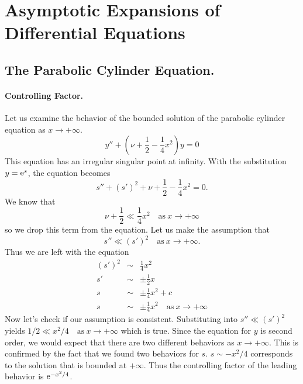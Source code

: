 \section{Asymptotic Expansions of Differential Equations}










\subsection{The Parabolic Cylinder Equation.}

\paragraph{Controlling Factor.}
Let us examine the behavior of the bounded solution of the parabolic 
cylinder equation as $x \to + \infty$.  
\[ y'' + \left(\nu + \frac{1}{2} - \frac{1}{4} x^2\right)y = 0\]
This equation has an irregular singular point at infinity.  
With the substitution $y = \mathop{\mathrm{e}}\nolimits^s$,
the equation becomes
\[s'' + (s')^2 + \nu + \frac{1}{2} - \frac{1}{4} x^2 = 0.\]
We know that 
\[ \nu + \frac{1}{2} \ll \frac{1}{4} x^2\quad \mathrm{as}\ x \to +\infty\]
so we drop this term from the equation. Let us make the assumption that
\[ s'' \ll (s')^2\quad \mathrm{as}\ x \to +\infty.\]
Thus we are left with the equation
\begin{eqnarray*}
  (s')^2 &\sim& \frac{1}{4} x^2 \\
  s' &\sim& \pm \frac{1}{2} x \\
  s &\sim& \pm \frac{1}{4} x^2 + c \\
  s &\sim& \pm \frac{1}{4} x^2\quad \mathrm{as}\ x \to +\infty
\end{eqnarray*}
Now let's check if our assumption is consistent.  Substituting into
$s'' \ll (s')^2$ yields $1/2 \ll x^2/4\quad \mathrm{as}\ x  \to +\infty$ which 
is true.  Since the equation for $y$ is second order, we would expect that 
there are two different behaviors as $x \to +\infty$.  This is 
confirmed by the fact that we found two behaviors for $s$.  $s \sim -x^2/4$
corresponds to the solution that is bounded at $+\infty$.
Thus the controlling factor of the leading behavior is $\mathop{\mathrm{e}}\nolimits^{-x^2/4}$.



